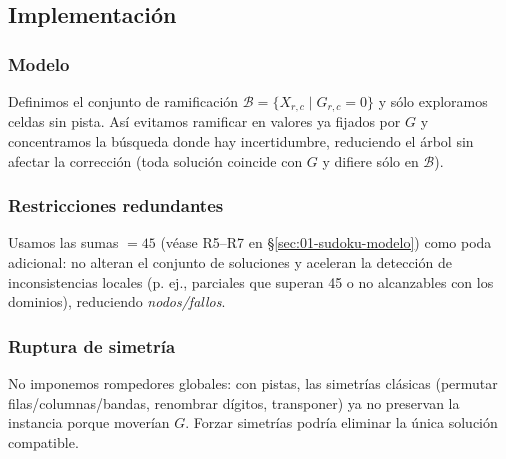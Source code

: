 
\subsection{Implementación}\label{sec:01-sudoku-implementacion}

\subsubsection*{Modelo}
Definimos el conjunto de ramificación \(\mathcal{B}=\{X_{r,c}\mid G_{r,c}=0\}\) y sólo exploramos celdas sin pista. Así evitamos ramificar en valores ya fijados por \(G\) y concentramos la búsqueda donde hay incertidumbre, reduciendo el árbol sin afectar la corrección (toda solución coincide con \(G\) y difiere sólo en \(\mathcal{B}\)).

\subsubsection*{Restricciones redundantes}
Usamos las sumas \(=45\) (véase R5–R7 en \S\ref{sec:01-sudoku-modelo}) como poda adicional: no alteran el conjunto de soluciones y aceleran la detección de inconsistencias locales (p. ej., parciales que superan 45 o no alcanzables con los dominios), reduciendo \emph{nodos/fallos}.

\subsubsection*{Ruptura de simetría}
No imponemos rompedores globales: con pistas, las simetrías clásicas (permutar filas/columnas/bandas, renombrar dígitos, transponer) ya no preservan la instancia porque moverían \(G\). Forzar simetrías podría eliminar la única solución compatible.
